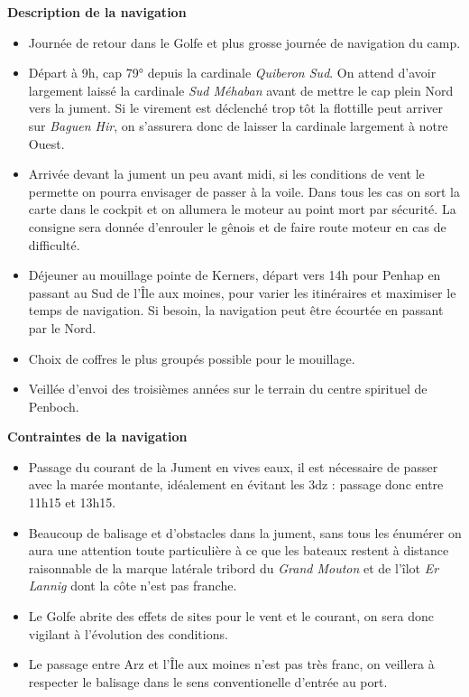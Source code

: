 \begin{minipage}[c][\textheight][t]{0.10\textwidth}
\hfill
\end{minipage}%
\begin{minipage}[c][\textheight][t]{0.50\textwidth}
    \vspace{3cm}
    \color{StrongBlue}    
    {\huge \textbf{Description de la navigation}}\\
            \begin{itemize}
                \item Journée de retour dans le Golfe et plus grosse journée de navigation du camp. 
                \item Départ à 9h, cap 79° depuis la cardinale \textit{Quiberon Sud}. On attend d'avoir largement laissé la cardinale \textit{Sud Méhaban} avant de mettre le cap plein Nord vers la jument. Si le virement est déclenché trop tôt la flottille peut arriver sur \textit{Baguen Hir}, on s'assurera donc de laisser la cardinale largement à notre Ouest. 
                \item Arrivée devant la jument un peu avant midi, si les conditions de vent le permette on pourra envisager de passer à la voile. Dans tous les cas on sort la carte dans le cockpit et on allumera le moteur au point mort par sécurité. La consigne sera donnée d'enrouler le gênois et de faire route moteur en cas de difficulté. 
                \item Déjeuner au mouillage pointe de Kerners, départ vers 14h pour Penhap en passant au Sud de l'Île aux moines, pour varier les itinéraires et maximiser le temps de navigation. Si besoin, la navigation peut être écourtée en passant par le Nord.
                \item Choix de coffres le plus groupés possible pour le mouillage. 
                \item Veillée d'envoi des troisièmes années sur le terrain du centre spirituel de Penboch. 
            \end{itemize}
        {
        \huge \textbf{Contraintes de la navigation}}\\
            \begin{itemize}
                \item Passage du courant de la Jument en vives eaux, il est nécessaire de passer avec la marée montante, idéalement en évitant les 3dz : passage donc entre 11h15 et 13h15. 
                \item Beaucoup de balisage et d'obstacles dans la jument, sans tous les énumérer on aura une attention toute particulière à ce que les bateaux restent à distance raisonnable de la marque latérale tribord du \textit{Grand Mouton} et de l'îlot \textit{Er Lannig} dont la côte n'est pas franche. 
                \item Le Golfe abrite des effets de sites pour le vent et le courant, on sera donc vigilant à l'évolution des conditions.  
                \item Le passage entre Arz et l'Île aux moines n'est pas très franc, on veillera à respecter le balisage dans le sens conventionelle d'entrée au port. 
            \end{itemize}
\end{minipage}%
